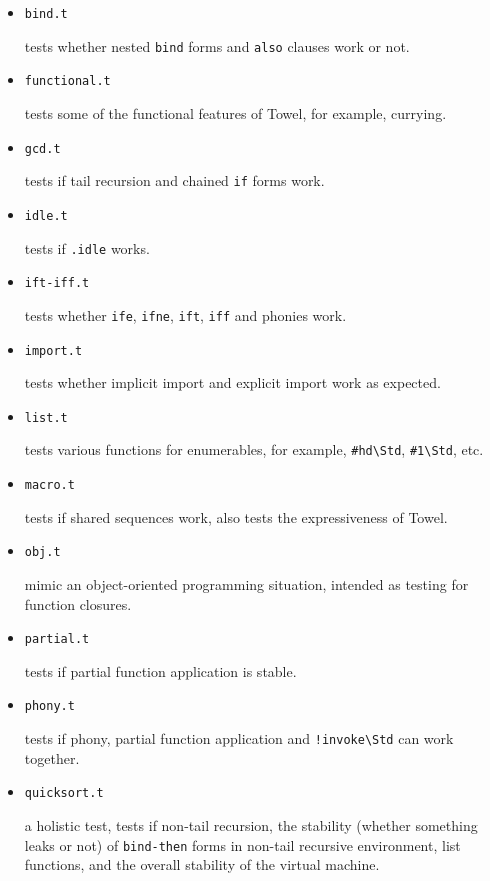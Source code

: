 \documentclass{report}
\newcommand{\mstd}[1]{\texttt{#1\textbackslash Std}}
\begin{document}
\begin{itemize}
\item \texttt{bind.t}

tests whether nested \texttt{bind} forms and \texttt{also} clauses work or not.

\item \texttt{functional.t}

tests some of the functional features of Towel, for example, currying.

\item \texttt{gcd.t}

tests if tail recursion and chained \texttt{if} forms work.

\item \texttt{idle.t}

tests if \texttt{.idle} works.

\item \texttt{ift-iff.t}

tests whether \texttt{ife}, \texttt{ifne}, \texttt{ift}, \texttt{iff} and phonies work.

\item \texttt{import.t}

tests whether implicit import and explicit import work as expected.

\item \texttt{list.t}

tests various functions for enumerables, for example, \mstd{\#hd}, \mstd{\#1}, etc.

\item \texttt{macro.t}

tests if shared sequences work, also tests the expressiveness of Towel.

\item \texttt{obj.t}

mimic an object-oriented programming situation, intended as testing for function closures.

\item \texttt{partial.t}

tests if partial function application is stable.

\item \texttt{phony.t}

tests if phony, partial function application and \mstd{!invoke} can work together.

\item \texttt{quicksort.t}

a holistic test, tests if non-tail recursion, the stability (whether something leaks or not) of \texttt{bind-then} forms in non-tail recursive environment, list functions, and the overall stability of the virtual machine.


\end{itemize}
\end{document}
